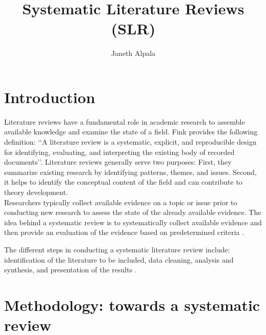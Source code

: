 \documentclass[letterpaper,10pt]{article}
\begin{document}
\title{Systematic Literature Reviews (SLR)}


\author{Janeth Alpala }

\address{  Universidade Federal de Pernambuco\\
}






\section{Introduction}

Literature reviews have a fundamental role in academic research to assemble available knowledge and examine the state of a field.
Fink \cite{fink2019conducting} provides the following definition: ‘‘A literature review is a systematic, explicit, and reproducible design for identifying, evaluating, and interpreting the existing body of recorded documents’’.  Literature reviews generally serve two purposes: First, they summarize existing research by identifying patterns, themes, and issues. Second, it helps to identify the conceptual content of the field and can contribute to theory development.\\

Researchers typically collect available evidence on a topic or issue prior to conducting new research to assess the state of the
already available evidence. The idea behind a systematic review is to systematically collect available evidence and then provide an evaluation of the evidence based on predetermined criteria \cite{Tranfield2003}.

The different steps in conducting a systematic literature review include: identification of the literature to be included, data cleaning, analysis and synthesis, and presentation of the results \cite{Linnenluecke2019}.


\section{ Methodology: towards a systematic review}
\end{document}
